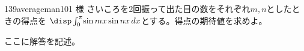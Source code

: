 \begin{prob}{139}{}{averageman101 様}
 さいころを2回振って出た目の数をそれぞれ$m, n$としたときの得点を $\disp \int_0^\pi\! \sin mx \sin nx \,dx$とする。得点の期待値を求めよ。
\end{prob}

ここに解答を記述。